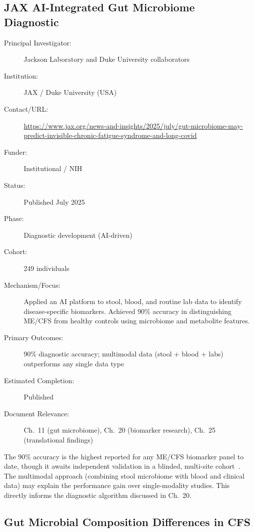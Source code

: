 \subsection{JAX AI-Integrated Gut Microbiome Diagnostic}
\label{sec:registry-jax-microbiome}

\begin{description}
    \item[Principal Investigator:] Jackson Laboratory and Duke University
        collaborators
    \item[Institution:] JAX / Duke University (USA)
    \item[Contact/URL:] \url{https://www.jax.org/news-and-insights/2025/july/gut-microbiome-may-predict-invisible-chronic-fatigue-syndrome-and-long-covid}
    \item[Funder:] Institutional / NIH
    \item[Status:] Published July 2025
    \item[Phase:] Diagnostic development (AI-driven)
    \item[Cohort:] 249 individuals
    \item[Mechanism/Focus:] Applied an AI platform to stool, blood, and
        routine lab data to identify disease-specific biomarkers.  Achieved
        90\% accuracy in distinguishing ME/CFS from healthy controls using
        microbiome and metabolite features.
    \item[Primary Outcomes:] 90\% diagnostic accuracy; multimodal data
        (stool + blood + labs) outperforms any single data type
    \item[Estimated Completion:] Published
    \item[Document Relevance:] Ch.~11 (gut microbiome), Ch.~20 (biomarker
        research), Ch.~25 (translational findings)
\end{description}

The 90\% accuracy is the highest reported for any ME/CFS biomarker panel to
date, though it awaits independent validation in a blinded, multi-site
cohort~\cite{JAXmicrobiome2025}.  The multimodal approach (combining stool
microbiome with blood and clinical data) may explain the performance gain
over single-modality studies.  This directly informs the diagnostic algorithm
discussed in Ch.~20.

\subsection{Gut Microbial Composition Differences in CFS}
\label{sec:registry-gut-composition}

